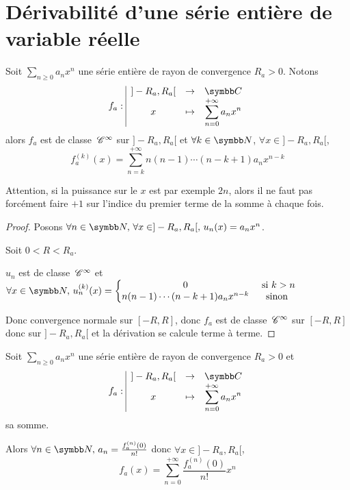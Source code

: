 \section{Dérivabilité d'une série entière de variable réelle }


\lvspace \avspace \begin{theoreme}{}{}
    Soit $\sum_{n \geqslant 0} a_n x^n$ une série entière de rayon de convergence $R_a > 0$.
    Notons $$\fonction{f_a}{]-R_a, R_a[}{\C}{x}{\sum_{n = 0}^{+\infty} a_n x^n}$$ alors 
    $f_a$ est de classe $\,\mathscr C^{\infty}$ sur $]-R_a, R_a[$ et 
    $\forall k \in \N$, $\forall x \in ]-R_a, R_a[$,
    $$f^{(k)}_a(x) = \sum_{n = k}^{+\infty} n (n - 1) \cdots (n - k + 1) a_n x^{n - k}$$
\end{theoreme}


\begin{remarque}
    Attention, si la puissance sur le $x$ est par exemple $2n$, alors il ne faut pas forcément 
    faire $+1$ sur l'indice du premier terme de la somme à chaque fois. 
\end{remarque}

\begin{proof}
    Posons $\forall n \in \N, \, \forall x \in ]-R_a, R_a[, \, u_n(x) = a_n x^n$.

    Soit $0 < R < R_a$. 

    $u_n $ est de classe $\,\mathscr C^{\infty}$ et $\forall x \in \N, \, u_n^{(k)}(x) = \left\{ \begin{matrix}
        0 & \text{ si } k > n \\
        n(n- 1) \cdots (n - k + 1) a_n x^{n - k} & \text{ sinon }
    \end{matrix} \right.$ 

    Donc convergence normale sur $[-R, R]$, donc $f_a$ est de classe $\,\mathscr C^{\infty}$ 
    sur $[-R, R]$ donc sur $]-R_a, R_a[$ et la dérivation se calcule terme à terme.
\end{proof}

\begin{corollaire}{}{}
    Soit $\sum_{n \geqslant 0} a_n x^n$ une série entière de rayon de convergence $R_a > 0$ 
    et $$\fonction{f_a}{]-R_a, R_a[}{\C}{x}{\sum_{n = 0}^{+\infty} a_n x^n}$$ sa somme. 

    Alors $\forall n \in \N, \, a_n = \frac{f_a^{(n)}(0)}{n!}$ donc 
    $\forall x \in ]-R_a, R_a[$, 
    $$f_a(x) = \sum_{n = 0}^{+\infty} \frac{f_a^{(n)}(0)}{n!} x^n$$
\end{corollaire}

